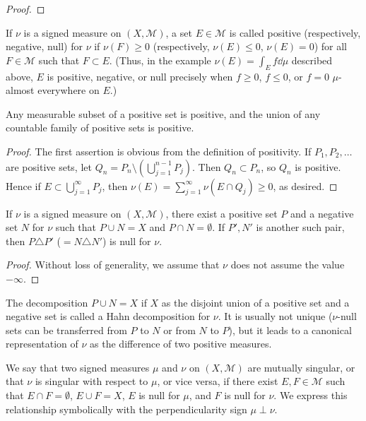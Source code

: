 \begin{proof}
    
\end{proof}

If $\nu$ is a signed measure on $(X, \mathcal{M})$, a set $E \in \mathcal{M}$ is called positive (respectively, negative, null) for $\nu$ if $\nu(F) \ge 0$ (respectively, $\nu(E) \le 0$, $\nu(E) = 0$) for all $F \in \mathcal{M}$ such that $F \subset E$.
(Thus, in the example $\nu(E) = \int_{E} f \dd \mu$ described above, $E$ is positive, negative, or null precisely when $f \ge 0$, $f \le 0$, or $f = 0$ $\mu$-almost everywhere on $E$.)


\begin{lemma}
    Any measurable subset of a positive set is positive, and the union of any countable family of positive sets is positive.
\end{lemma}

\begin{proof}
    The first assertion is obvious from the definition of positivity.
    If $P_1, P_2, \dots$ are positive sets, let $Q_n = P_n \setminus (\bigcup_{j=1}^{n-1} P_j)$.
    Then $Q_n \subset P_n$, so $Q_n$ is positive.
    Hence if $E \subset \bigcup_{j=1}^{\infty} P_j$, then $\nu(E) = \sum_{j=1}^{\infty} \nu(E \cap Q_j) \ge 0$, as desired.
\end{proof}

\begin{theorem}
    If $\nu$ is a signed measure on $(X, \mathcal{M})$, there exist a positive set $P$ and a negative set $N$ for $\nu$ such that $P \cup N = X$ and $P \cap N = \emptyset$.
    If $P', N'$ is another such pair, then $P \triangle P'$ ($= N \triangle N'$) is null for $\nu$.
\end{theorem}

\begin{proof}
    Without loss of generality, we assume that $\nu$ does not assume the value $-\infty$.
\end{proof}

The decomposition $P \cup N = X$ if $X$ as the disjoint union of a positive set and a negative set is called a Hahn decomposition for $\nu$.
It is usually not unique ($\nu$-null sets can be transferred from $P$ to $N$ or from $N$ to $P$), but it leads to a canonical representation of $\nu$ as the difference of two positive measures.

\begin{definition}
    We say that two signed measures $\mu$ and $\nu$ on $(X, \mathcal{M})$ are mutually singular, or that $\nu$ is singular with respect to $\mu$, or vice versa, if there exist $E, F \in \mathcal{M}$ such that $E \cap F = \emptyset$, $E \cup F = X$, $E$ is null for $\mu$, and $F$ is null for $\nu$.
    We express this relationship symbolically with the perpendicularity sign $\mu \perp \nu$.
\end{definition}

